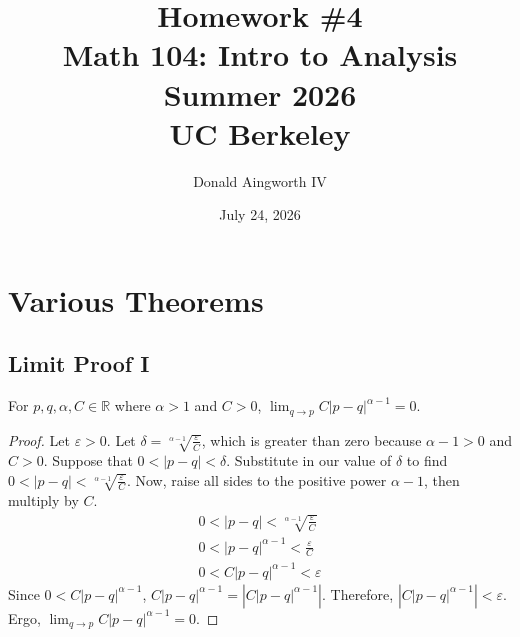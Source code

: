 \documentclass[11pt]{article}
\title{Homework \#4\\{\large Math 104: Intro to Analysis \\ Summer 2026} \\ {\normalsize UC Berkeley}}
\date{July 24, 2026}
\author{Donald Aingworth IV}
\begin{document}
\renewcommand\qedsymbol{OE$\Delta$}
\newcommand{\abs}[1]{\left| #1 \right|}
\newcommand{\andtxt}{\text{ and }}
\newcommand{\Ais}{\ensuremath{\overset{A}{=}}}
\newcommand{\Cis}{\ensuremath{\overset{C}{=}}}
\newcommand{\closure}[1]{\ensuremath{\overline{#1}}}
\newcommand{\encircle}[1]{%
  \tikz[baseline=(char.base)]{%
    \node[shape=circle, draw, inner sep=1pt] (char) {#1};%
  }%
}
\newcommand{\mathif}{\text{if }}
\newcommand{\seq}[2][n]{\ensuremath{\left\{ #2 _{#1} \right\}}}
\newcommand{\zz}[1]{$\mathbb{Z}/ #1 \mathbb{Z}$}

\maketitle

\tableofcontents

\pagebreak
\setcounter{section}{-1}
\section{Various Theorems}
    \subsection{Limit Proof I}
        \label{thm:0.1}
        For $p,q,\alpha,C \in \mathbb{R}$ where $\alpha > 1$ and $C > 0$, $\lim_{q \to p} C\abs{p - q}^{\alpha - 1} = 0$.
        \begin{proof}
            Let $\varepsilon > 0$.
            Let $\delta = \sqrt[\alpha - 1]{\frac{\varepsilon}{C}}$, which is greater than zero because $\alpha - 1 > 0$ and $C > 0$.
            Suppose that $0 < \abs{p - q} < \delta$.
            Substitute in our value of $\delta$ to find $0 < \abs{p - q} < \sqrt[\alpha - 1]{\frac{\varepsilon}{C}}$.
            Now, raise all sides to the positive power $\alpha - 1$, then multiply by $C$.
            \begin{gather}
                0 < \abs{p - q} < \sqrt[\alpha - 1]{\frac{\varepsilon}{C}}\\
                0 < \abs{p - q}^{\alpha - 1} < \frac{\varepsilon}{C}\\
                0 < C \abs{p - q}^{\alpha - 1} < \varepsilon
            \end{gather}
            Since $0 < C \abs{p - q}^{\alpha - 1}$, $C \abs{p - q}^{\alpha - 1} = \abs{C \abs{p - q}^{\alpha - 1}}$.
            Therefore, $\abs{C \abs{p - q}^{\alpha - 1}} < \varepsilon$.
            Ergo, $\lim_{q \to p} C\abs{p - q}^{\alpha - 1} = 0$.
        \end{proof}
\end{document}
